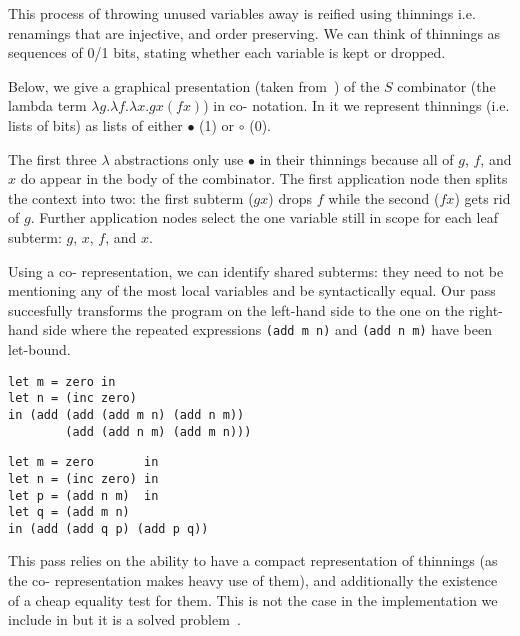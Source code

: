 This process of throwing unused variables away is reified using thinnings
i.e. renamings that are injective, and order preserving.
%
We can think of thinnings as sequences of 0/1 bits, stating whether each variable
is kept or dropped.

Below, we give a graphical presentation (taken from~\cite{MANUAL:draft/Allais22})
of the $S$ combinator (the lambda term $\lambda g. \lambda f. \lambda x. g x (f x)$)
in co-\DeBruijn{} notation.
%
In it we represent thinnings (i.e. lists of bits) as lists of either
$\bullet$ (1) or $\circ$ (0).

\begin{center}
  \codebruijnexamplegraph{}
\end{center}

The first three $\lambda$ abstractions only use $\bullet$ in their
thinnings because all of $g$, $f$, and $x$ do appear in the body of the combinator.
%
The first application node then splits the context into two:
the first subterm ($g x$) drops $f$
while the second ($f x$) gets rid of $g$.
%
Further application nodes select the one variable still in scope for each leaf subterm: $g$, $x$, $f$, and $x$.

Using a co-\DeBruijn{} representation, we can identify shared subterms:
%
they need to not be mentioning any of the most local variables and be syntactically equal.
%
Our pass succesfully transforms the program on the left-hand side to the one
on the right-hand side where the repeated expressions \texttt{(add m n)}
and \texttt{(add n m)} have been let-bound.

\begin{center}
  \begin{minipage}[t]{0.4\textwidth}
    \begin{Verbatim}
let m = zero in
let n = (inc zero)
in (add (add (add m n) (add n m))
        (add (add n m) (add m n)))
    \end{Verbatim}
  \end{minipage}\hfill\begin{minipage}[t]{0.4\textwidth}
    \begin{Verbatim}
let m = zero       in
let n = (inc zero) in
let p = (add n m)  in
let q = (add m n)
in (add (add q p) (add p q))
    \end{Verbatim}
  \end{minipage}
\end{center}

This pass relies on the ability to have a compact representation of thinnings
(as the co-\DeBruijn{} representation makes heavy use of them),
and additionally the existence of a cheap equality test for them.
%
This is not the case in the implementation we include in \Velo{} but
it is a solved problem~\cite{MANUAL:draft/Allais22}.
